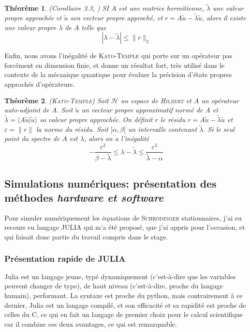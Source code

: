 \documentclass[svgnames,dvipsnames,a4paper,10pt,french]{report}
\newtheorem{theorem}{Théorème}[section]
\begin{document}
\begin{theorem}{(Corollaire 3.3, \cite{saad_numerical_2011})}
    SI $A$ est une matrice hermitienne, $\tilde{\lambda}$ une valeur propre approchée et $\tilde{u}$ son vecteur propre approché, et $r=A\tilde{u} - \tilde{\lambda} \tilde{u}$, alors il existe une valeur propre $\lambda$ de $A$ telle que \begin{equation}
        |\lambda - \tilde{\lambda} | \le \|r\|_2
    \end{equation}
\end{theorem}


Enfin, nous avons l'inégalité de \textsc{Kato-Temple} qui porte sur un opérateur pas forcément en dimension finie, et donne un résultat fort, très utilisé dans le contexte de la mécanique quantique pour évaluer la précision d'états propres approchés d'opérateurs.


\begin{theorem}{(\textsc{Kato-Temple})}
Soit $\mathcal{H}$ un espace de \textsc{Hilbert} et $A$ un opérateur auto-adjoint de $A$. Soit $\tilde{u}$ un vecteur propre approximatif normé de $A$ et  $\tilde{\lambda} = \langle A\tilde{u}|\tilde{u}\rangle$ sa valeur propre approchée. On définit $r$ le résidu $r=A\tilde{u}-\tilde{\lambda} \tilde{u}$ et  $\varepsilon = \|r\|$ la norme du résidu. Soit $]\alpha,\beta[$ un intervalle  contenant $\tilde{\lambda}$. Si le seul point du spectre de $A$ est $\lambda$, alors on a l'inégalité
\begin{equation}
\label{kato_temple_inqeuality}
    - \frac{\varepsilon^2}{\beta - \tilde{\lambda}} \le \lambda - \tilde{\lambda} \le \frac{\varepsilon^2}{\tilde{\lambda} - \alpha}
\end{equation}
\end{theorem}






\subsection{Simulations numériques: présentation des méthodes \emph{hardware et software}}

Pour simuler numériquement les équations de \textsc{Schrödinger} stationnaires, j'ai eu recours eu langage JULIA qui m'a été proposé, que j'ai appris pour l'occasion, et qui faisait donc partie du travail compris dans le stage.




\subsubsection{Présentation rapide de JULIA}
Julia est un langage jeune, typé dynamiquement (c'est-à-dire que les variables peuvent changer de type), de haut niveau  (c'est-à-dire, proche du langage humain), performant. La syntaxe est proche du python, mais contrairement à ce dernier, Julia est un langage compilé, et son efficacité et sa rapidité est proche de celles du C, ce qui en fait un langage de premier choix pour le calcul scientifique car il combine ces deux avantages, ce qui est remarquable.
\end{document}
